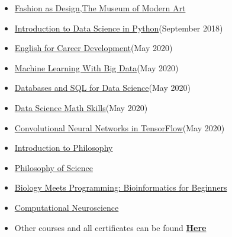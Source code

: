 \documentclass[letterpaper,MMMyyyy,nonstopmode]{simpleresumecv}
\begin{document}
\begin{Body}
\begin{itemize}
\begin{itemize}
    
            
            \item \href {https://www.coursera.org/account/accomplishments/certificate/2L2LR5CLCKV3}
            {Fashion as Design,The Museum of Modern Art}
        
         
                 \item \href {https://www.coursera.org/account/accomplishments/verify/SHNVDERAXLHU}{Introduction to Data Science in Python}(September 2018)
             
        
        \item \href {https://www.coursera.org/account/accomplishments/certificate/RPZJQLVQJAC3}{English for Career Development}(May 2020)
        
        \item \href {https://www.coursera.org/account/accomplishments/certificate/DSDTJAJ225PF}{Machine Learning With Big Data}(May 2020)
        
        \item \href {https://www.coursera.org/account/accomplishments/certificate/N4B2R35GAXB2}{    Databases and SQL for Data Science}(May 2020)
        
        
        \item \href {https://www.coursera.org/account/accomplishments/certificate/7H53FKHFAEGQ}{Data Science Math Skills}(May 2020)
        
        
        \item \href {https://www.coursera.org/account/accomplishments/certificate/5MV7NYYEZ7SQ}{   Convolutional Neural Networks in TensorFlow}(May 2020)
        
       \item \href{https://www.coursera.org/account/accomplishments/certificate/LK22QA98NHP8}{    Introduction to Philosophy}
       \item \href{https://www.coursera.org/account/accomplishments/certificate/4MDAYTPAZDC2}{Philosophy of Science}
       \item \href{https://www.coursera.org/account/accomplishments/certificate/H65GN6U32DPY}{Biology Meets Programming: Bioinformatics for Beginners}
       \item \href{https://www.coursera.org/account/accomplishments/certificate/BUU9S5EZ9KK6}{Computational Neuroscience}
       \newline
        \item 
    Other courses and all certificates can be found \href{https://github.com/Yasaman1997/Certificates} {\textbf{Here}}
    \end{itemize}
  \end{itemize}
  

\end{Body}
\end{document}
